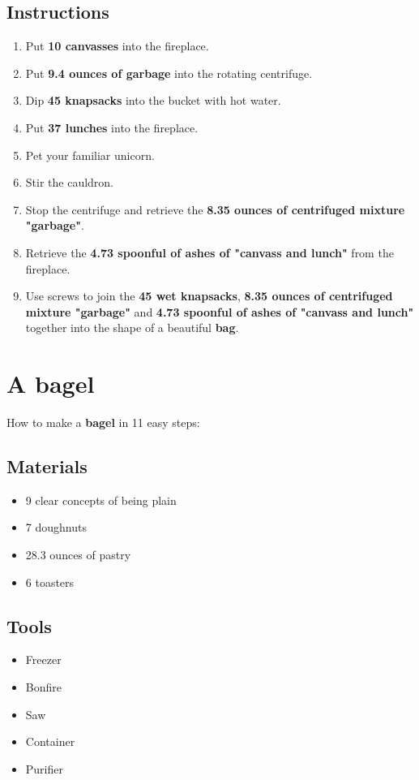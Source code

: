 \documentclass{article}
\begin{document}
\subsection{Instructions}\begin{enumerate}
\item 
Put \textbf{10 canvasses} into the fireplace.
\item 
Put \textbf{9.4 ounces of garbage} into the rotating centrifuge.
\item 
Dip \textbf{45 knapsacks} into the bucket with hot water.
\item 
Put \textbf{37 lunches} into the fireplace.
\item 
Pet your familiar unicorn.
\item 
Stir the cauldron.
\item 
Stop the centrifuge and retrieve the \textbf{8.35 ounces of centrifuged mixture "garbage"}.
\item 
Retrieve the \textbf{4.73 spoonful of ashes of "canvass and lunch"} from the fireplace.
\item 
Use screws to join the \textbf{45 wet knapsacks}, \textbf{8.35 ounces of centrifuged mixture "garbage"} and \textbf{4.73 spoonful of ashes of "canvass and lunch"} together into the shape of a beautiful \textbf{bag}.
\end{enumerate}
\newpage
\section{A bagel}How to make a \textbf{bagel} in 11 easy steps:

\subsection{Materials}\begin{itemize}
\item 
9 clear concepts of being plain
\item 
7 doughnuts
\item 
28.3 ounces of pastry
\item 
6 toasters
\end{itemize}
\subsection{Tools}\begin{itemize}
\item 
Freezer
\item 
Bonfire
\item 
Saw
\item 
Container
\item 
Purifier
\end{itemize}
\end{document}
